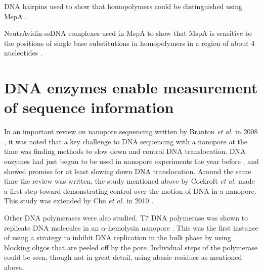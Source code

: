 DNA hairpins used to show that homopolymers could be distinguished using MspA \citep{Derrington2010}.

NeutrAvidin-ssDNA complexes used in MspA to show that MspA is sensitive to the positions of single base substitutions in homopolymers in a region of about 4 nucleotides \citep{Manrao2011}.

%
%
%
%
%
%
%
%


\section{DNA enzymes enable measurement of sequence information}

In an important review on nanopore sequencing written by Branton \textit{et al.} in 2008 \citep{Branton2008}, it was noted that a key challenge to DNA sequencing with a nanopore at the time was finding methods to slow down and control DNA translocation.  DNA enzymes had just begun to be used in nanopore experiments the year before \citep{Astier2007, Hornblower2007}, and showed promise for at least slowing down DNA translocation.  Around the same time the review was written, the study mentioned above by Cockroft \textit{et al.} \citep{Cockroft2008} made a first step toward demonstrating control over the motion of DNA in a nanopore.  This study was extended by Chu \textit{et al.} in 2010 \citep{Chu2010}.

Other DNA polymerases were also studied.  T7 DNA polymerase was shown to replicate DNA molecules in an $\alpha$-hemolysin nanopore \citep{Olasagasti2010}.  This was the first instance of using a strategy to inhibit DNA replication in the bulk phase by using blocking oligos that are peeled off by the pore.  Individual steps of the polymerase could be seen, though not in great detail, using abasic residues as mentioned above.

